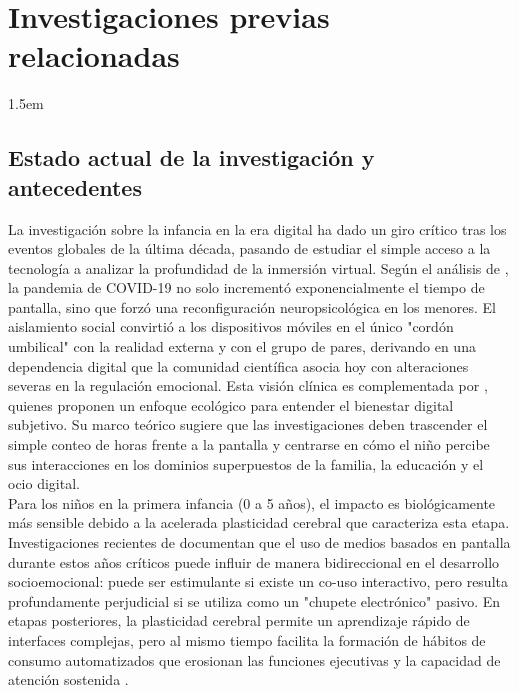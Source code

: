 \chapter{Investigaciones previas relacionadas}
\label{chap:investigaciones-previas}

\insertminitoc
\parindent1.5em

\section{Estado actual de la investigación y antecedentes}

La investigación sobre la infancia en la era digital ha dado un giro crítico tras los eventos globales de la última década, pasando de estudiar el simple acceso a la tecnología a analizar la profundidad de la inmersión virtual. Según el análisis de \cite{limone_psychological_2021}, la pandemia de COVID-19 no solo incrementó exponencialmente el tiempo de pantalla, sino que forzó una reconfiguración neuropsicológica en los menores. El aislamiento social convirtió a los dispositivos móviles en el único "cordón umbilical" con la realidad externa y con el grupo de pares, derivando en una dependencia digital que la comunidad científica asocia hoy con alteraciones severas en la regulación emocional. Esta visión clínica es complementada por \cite{holmarsdottir_integrative_2025}, quienes proponen un enfoque ecológico para entender el bienestar digital subjetivo. Su marco teórico sugiere que las investigaciones deben trascender el simple conteo de horas frente a la pantalla y centrarse en cómo el niño percibe sus interacciones en los dominios superpuestos de la familia, la educación y el ocio digital.\\



Para los niños en la primera infancia (0 a 5 años), el impacto es biológicamente más sensible debido a la acelerada plasticidad cerebral que caracteriza esta etapa. Investigaciones recientes de \cite{swider-cios_young_2023} documentan que el uso de medios basados en pantalla durante estos años críticos puede influir de manera bidireccional en el desarrollo socioemocional: puede ser estimulante si existe un co-uso interactivo, pero resulta profundamente perjudicial si se utiliza como un "chupete electrónico" pasivo. En etapas posteriores, la plasticidad cerebral permite un aprendizaje rápido de interfaces complejas, pero al mismo tiempo facilita la formación de hábitos de consumo automatizados que erosionan las funciones ejecutivas y la capacidad de atención sostenida \cite{clemente-suarez_digital_2024}. \\

